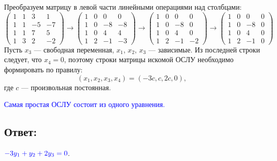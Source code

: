 \documentclass[12pt]{article}
\begin{document}
    Преобразуем матрицу в левой части линейными операциями над столбцами:
    \[
        \begin{pmatrix}
            1 & 1 & 3  & 1  \\
            1 & 1 & -5 & -7 \\
            1 & 1 & 7  & 5  \\
            1 & 3 & 2  & -2
        \end{pmatrix}
        \rightarrow
        \begin{pmatrix}
            1 & 0 & 0  & 0  \\
            1 & 0 & -8 & -8 \\
            1 & 0 & 4  & 4  \\
            1 & 2 & -1 & -3
        \end{pmatrix}
        \rightarrow
        \begin{pmatrix}
            1 & 0 & 0  & 0  \\
            1 & 0 & -8 & 0  \\
            1 & 0 & 4  & 0  \\
            1 & 2 & -1 & -2
        \end{pmatrix}
        \rightarrow
        \begin{pmatrix}
            1 & 0 & 0  & 0 \\
            1 & 0 & -8 & 0 \\
            1 & 0 & 4  & 0 \\
            1 & 2 & -1 & 0
        \end{pmatrix}
    \]
    Пусть $x_3$ --- свободная переменная, $x_1$, $x_2$, $x_3$ --- зависимые. Из последней строки следует, что $x_4 = 0$, поэтому строки матрицы искомой ОСЛУ необходимо формировать
    по правилу:
    \[
        \left ( x_1, x_2, x_3, x_4 \right ) = \left ( - 3 c, c, 2 c, 0 \right ) ,
    \]
    где $c$ --- произвольная постоянная.

    \textcolor{blue}{Самая простая ОСЛУ состоит из одного уравнения.}

    \subsection*{Ответ:}
    $\color{blue} -3 y_1 + y_2 + 2 y_3 = 0 $.
\end{document}
